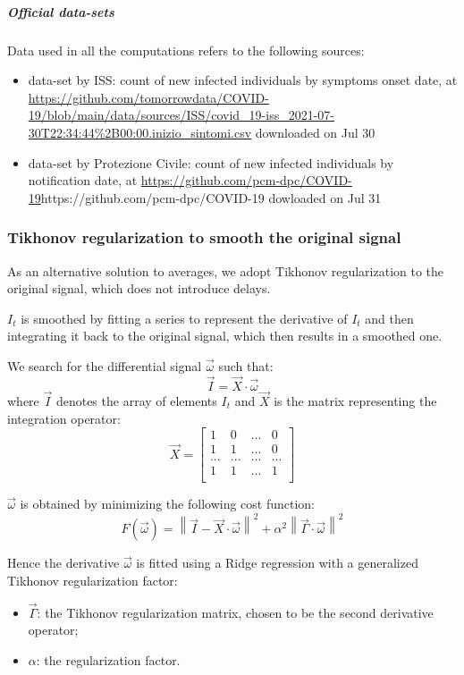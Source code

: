 \documentclass[graybox]{svmult}
\begin{document}
\subparagraph{Official data-sets}
Data used in all the computations refers to the following sources:
\begin{itemize}
    \item data-set by ISS: count of new infected individuals by symptoms onset date, at \url{https://github.com/tomorrowdata/COVID-19/blob/main/data/sources/ISS/covid_19-iss_2021-07-30T22:34:44\%2B00:00.inizio_sintomi.csv} downloaded on Jul 30
    \item data-set by Protezione Civile: count of new infected individuals by notification date, at \url{https://github.com/pcm-dpc/COVID-19}{https://github.com/pcm-dpc/COVID-19} dowloaded on Jul 31
\end{itemize}


\subsubsection{Tikhonov regularization to smooth the original signal}

As an alternative solution to averages, we adopt Tikhonov regularization to the original signal, which does not introduce delays.

$I_t$ is smoothed by fitting a series to represent the derivative of $I_t$ and then integrating it back to the original signal, which then results in a smoothed one.

We search for the differential signal $\vec{\omega}$ such that:
$$\vec{I} = \vec{X}\cdot \vec{\omega}$$
where $\vec{I}$ denotes the array of elements $I_t$ and $\vec{X}$ is the matrix representing the integration operator:
$$\vec{X} = \begin{bmatrix} 
1 & 0 & ... & 0 \\
1 & 1 & ... & 0 \\
... & ... & ...  & ... \\
1 & 1 & ... & 1 \\
\end{bmatrix}
$$

$\vec{\omega}$ is obtained by minimizing the following cost function:
\begin{equation}
F(\vec{\omega}) = \left\|\vec{I} - \vec{X}\cdot\vec{\omega}\right\|^2 +\alpha^2 \left\|\vec{\Gamma}\cdot\vec{\omega}\right\|^2
\label{TickCostFunction}
\end{equation}

Hence the derivative $\vec{\omega}$ is fitted using a Ridge regression with a generalized Tikhonov regularization factor:
\begin{itemize}
    \item 
    $\vec{\Gamma}$: the Tikhonov regularization matrix, chosen to be the second derivative operator;
    \item
    $\alpha$: the regularization factor.
\end{itemize}
\end{document}
